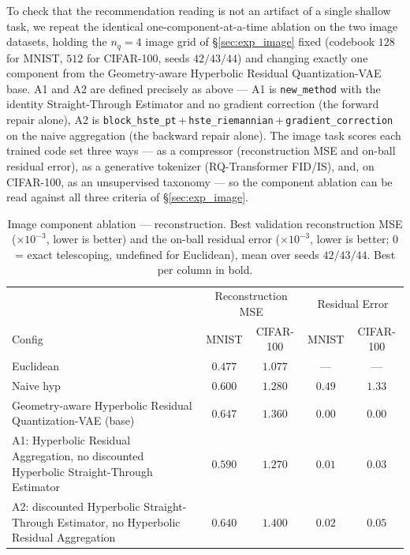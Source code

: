 \documentclass[12pt]{report}
\begin{document}
To check that the recommendation reading is not an artifact of a single shallow task, we repeat the identical one-component-at-a-time ablation on the two image datasets, holding the $n_q=4$ image grid of \S\ref{sec:exp_image} fixed (codebook $128$ for MNIST, $512$ for CIFAR-100, seeds $42/43/44$) and changing exactly one component from the Geometry-aware Hyperbolic Residual Quantization-VAE base. A1 and A2 are defined precisely as above --- A1 is \texttt{new\_method} with the identity Straight-Through Estimator and no gradient correction (the forward repair alone), A2 is \texttt{block\_hste\_pt}\,+\,\texttt{hste\_riemannian}\,+\,\texttt{gradient\_correction} on the naive aggregation (the backward repair alone). The image task scores each trained code set three ways --- as a compressor (reconstruction MSE and on-ball residual error), as a generative tokenizer (RQ-Transformer FID/IS), and, on CIFAR-100, as an unsupervised taxonomy --- so the component ablation can be read against all three criteria of \S\ref{sec:exp_image}.

\begin{table}[h]
\centering
\caption{Image component ablation --- reconstruction. Best validation reconstruction MSE ($\times10^{-3}$, lower is better) and the on-ball residual error ($\times10^{-3}$, lower is better; $0$ = exact telescoping, undefined for Euclidean), mean over seeds $42/43/44$. Best per column in bold.}
\label{tab:abl_img_recon}
\begin{tabular}{lcccc}
\hline
 & \multicolumn{2}{c}{Reconstruction MSE} & \multicolumn{2}{c}{Residual Error} \\
Config & MNIST & CIFAR-100 & MNIST & CIFAR-100 \\
\hline
Euclidean            & $\mathbf{0.477}$ & $\mathbf{1.077}$ & --- & --- \\
Naive hyp          & $0.600$ & $1.280$ & $0.49$ & $1.33$ \\
Geometry-aware Hyperbolic Residual Quantization-VAE (base)     & $0.647$ & $1.360$ & $\mathbf{0.00}$ & $\mathbf{0.00}$ \\
A1: Hyperbolic Residual Aggregation, no discounted Hyperbolic Straight-Through Estimator   & $0.590$ & $1.270$ & $0.01$ & $0.03$ \\
A2: discounted Hyperbolic Straight-Through Estimator, no Hyperbolic Residual Aggregation   & $0.640$ & $1.400$ & $0.02$ & $0.05$ \\
\hline
\end{tabular}
\end{table}
\end{document}
